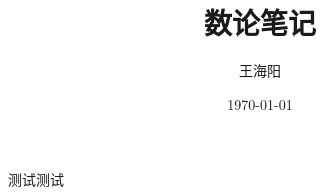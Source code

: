 \documentclass{article}
\begin{document}
\title{数论笔记}
\author{王海阳}
\date{\today}
\maketitle
\tableofcontents

测试测试






\end{document}

